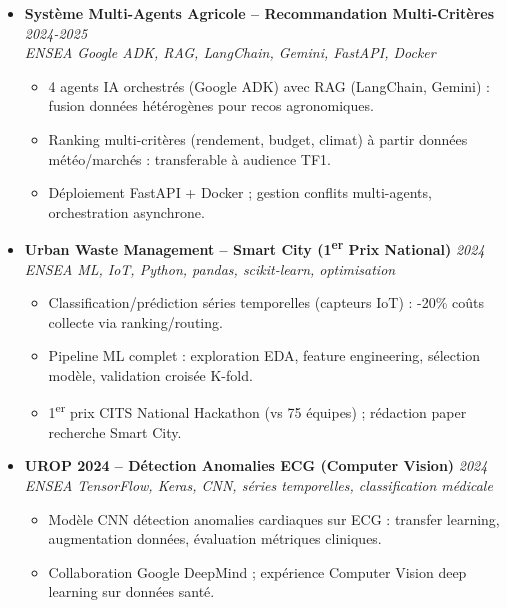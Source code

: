 \documentclass[a4paper,11pt]{article}
\begin{document}
\begin{itemize}[leftmargin=*, label=\tiny$\bullet$, nosep]
    \item \textbf{Syst\`eme Multi-Agents Agricole -- Recommandation Multi-Crit\`eres} \hfill \textit{2024-2025} \\
    \textit{ENSEA} \hfill \textit{Google ADK, RAG, LangChain, Gemini, FastAPI, Docker}
    \vspace{-2pt}
    \begin{itemize}[leftmargin=0.4cm, nosep, label=\tiny$\bullet$]
        \item \small{4 agents IA orchestr\'es (Google ADK) avec RAG (LangChain, Gemini) : fusion donn\'ees h\'et\'erog\`enes pour recos agronomiques.}
        \item \small{Ranking multi-crit\`eres (rendement, budget, climat) \`a partir donn\'ees m\'et\'eo/march\'es : transferable \`a audience TF1.}
        \item \small{D\'eploiement FastAPI + Docker ; gestion conflits multi-agents, orchestration asynchrone.}
    \end{itemize}
    \vspace{3pt}

    \item \textbf{Urban Waste Management -- Smart City (1\textsuperscript{er} Prix National)} \hfill \textit{2024} \\
    \textit{ENSEA} \hfill \textit{ML, IoT, Python, pandas, scikit-learn, optimisation}
    \vspace{-2pt}
    \begin{itemize}[leftmargin=0.4cm, nosep, label=\tiny$\bullet$]
        \item \small{Classification/pr\'ediction s\'eries temporelles (capteurs IoT) : -20\% co\^uts collecte via ranking/routing.}
        \item \small{Pipeline ML complet : exploration EDA, feature engineering, s\'election mod\`ele, validation crois\'ee K-fold.}
        \item \small{1\textsuperscript{er} prix CITS National Hackathon (vs 75 \'equipes) ; r\'edaction paper recherche Smart City.}
    \end{itemize}
    \vspace{3pt}

    \item \textbf{UROP 2024 -- D\'etection Anomalies ECG (Computer Vision)} \hfill \textit{2024} \\
    \textit{ENSEA} \hfill \textit{TensorFlow, Keras, CNN, s\'eries temporelles, classification m\'edicale}
    \vspace{-2pt}
    \begin{itemize}[leftmargin=0.4cm, nosep, label=\tiny$\bullet$]
        \item \small{Mod\`ele CNN d\'etection anomalies cardiaques sur ECG : transfer learning, augmentation donn\'ees, \'evaluation m\'etriques cliniques.}
        \item \small{Collaboration Google DeepMind ; exp\'erience Computer Vision deep learning sur donn\'ees sant\'e.}
    \end{itemize}
    \vspace{3pt}


\end{itemize}
\end{document}
